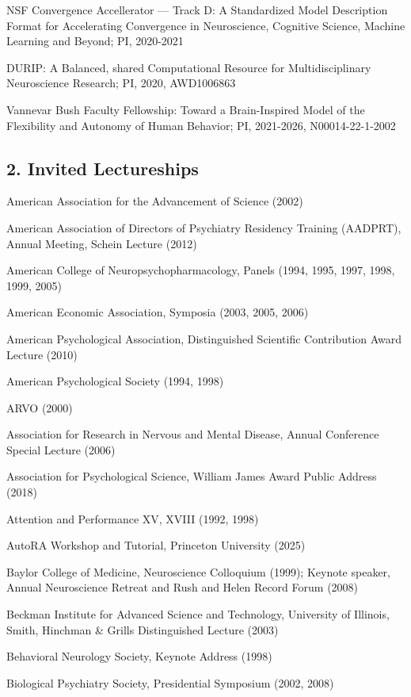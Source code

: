 \documentclass[10 pt]{article}
\begin{document}
NSF Convergence Accellerator — Track D:
A Standardized Model Description Format for Accelerating Convergence in Neuroscience, Cognitive Science, Machine
Learning and Beyond;
PI,
2020-2021

DURIP:
A Balanced, shared Computational Resource for Multidisciplinary Neuroscience Research;
PI,
2020,
AWD1006863

Vannevar Bush Faculty Fellowship:
Toward a Brain-Inspired Model of the Flexibility and Autonomy of Human Behavior;
PI,
2021-2026,
N00014-22-1-2002


\subsection*{2. Invited Lectureships} \label{secRAPA2}

American Association for the Advancement of Science (2002)

American Association of Directors of Psychiatry Residency Training (AADPRT), Annual Meeting, Schein Lecture (2012)

American College of Neuropsychopharmacology, Panels (1994, 1995, 1997, 1998, 1999, 2005)

American Economic Association, Symposia (2003, 2005, 2006)

American Psychological Association, Distinguished Scientific Contribution Award Lecture (2010)

American Psychological Society (1994, 1998)

ARVO (2000)

Association for Research in Nervous and Mental Disease, Annual Conference Special Lecture (2006)

Association for Psychological Science, William James Award Public Address (2018)

Attention and Performance XV, XVIII (1992, 1998)

AutoRA Workshop and Tutorial, Princeton University (2025)

Baylor College of Medicine, Neuroscience Colloquium (1999); Keynote speaker, Annual Neuroscience Retreat and Rush and Helen Record Forum (2008)

Beckman Institute for Advanced Science and Technology, University of Illinois, Smith, Hinchman \& Grills Distinguished Lecture (2003)

Behavioral Neurology Society, Keynote Address (1998)

Biological Psychiatry Society, Presidential Symposium (2002, 2008)
\end{document}
